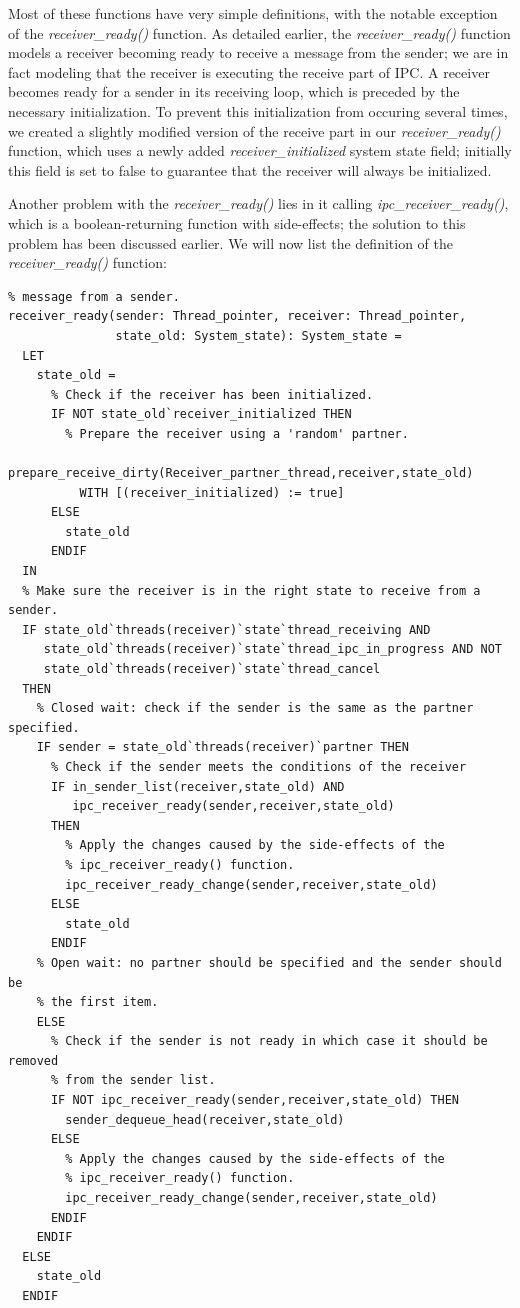 Most of these functions have very simple definitions, with the notable exception of the \emph{receiver\_ready()} function. As detailed earlier, the \emph{receiver\_ready()} function models a receiver becoming ready to receive a message from the sender; we are in fact modeling that the receiver is executing the receive part of IPC. A receiver becomes ready for a sender in its receiving loop, which is preceded by the necessary initialization. To prevent this initialization from occuring several times, we created a slightly modified version of the receive part in our \emph{receiver\_ready()} function, which uses a newly added \emph{receiver\_initialized} system state field; initially this field is set to false to guarantee that the receiver will always be initialized.\emptyline

Another problem with the \emph{receiver\_ready()} lies in it calling \emph{ipc\_receiver\_ready()}, which is a boolean-returning function with side-effects; the solution to this problem has been discussed earlier. We will now list the definition of the \emph{receiver\_ready()} function:

\lstset{language=PVS}
\begin{lstlisting}[caption={PVS: \emph{ipc\_receiver\_ready()} function.}]
% This preemption action signifies a receiver becoming ready to receive a 
% message from a sender.
receiver_ready(sender: Thread_pointer, receiver: Thread_pointer,
               state_old: System_state): System_state = 
  LET
    state_old = 
      % Check if the receiver has been initialized.
      IF NOT state_old`receiver_initialized THEN 
        % Prepare the receiver using a 'random' partner.
        prepare_receive_dirty(Receiver_partner_thread,receiver,state_old)
          WITH [(receiver_initialized) := true]
      ELSE
        state_old
      ENDIF
  IN
  % Make sure the receiver is in the right state to receive from a sender.
  IF state_old`threads(receiver)`state`thread_receiving AND
     state_old`threads(receiver)`state`thread_ipc_in_progress AND NOT
     state_old`threads(receiver)`state`thread_cancel
  THEN
    % Closed wait: check if the sender is the same as the partner specified.
    IF sender = state_old`threads(receiver)`partner THEN
      % Check if the sender meets the conditions of the receiver
      IF in_sender_list(receiver,state_old) AND 
         ipc_receiver_ready(sender,receiver,state_old)
      THEN
        % Apply the changes caused by the side-effects of the 
        % ipc_receiver_ready() function.
        ipc_receiver_ready_change(sender,receiver,state_old)
      ELSE
        state_old
      ENDIF
    % Open wait: no partner should be specified and the sender should be 
    % the first item.
    ELSE
      % Check if the sender is not ready in which case it should be removed
      % from the sender list.
      IF NOT ipc_receiver_ready(sender,receiver,state_old) THEN
        sender_dequeue_head(receiver,state_old)
      ELSE
        % Apply the changes caused by the side-effects of the
        % ipc_receiver_ready() function.
        ipc_receiver_ready_change(sender,receiver,state_old)
      ENDIF
    ENDIF    
  ELSE
    state_old
  ENDIF
\end{lstlisting}